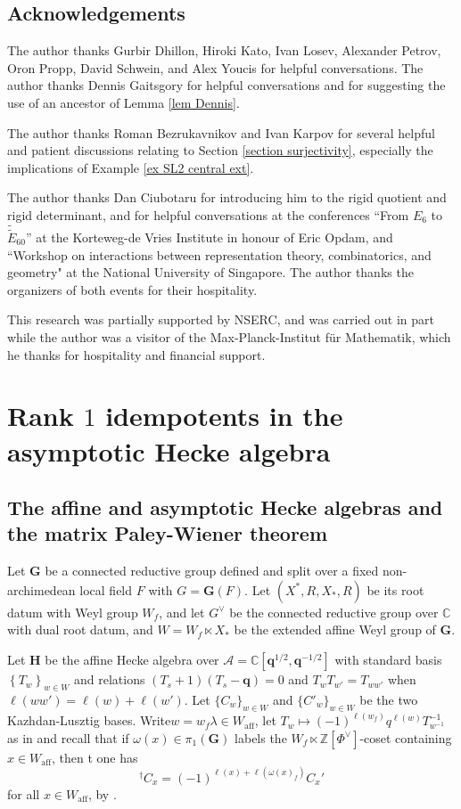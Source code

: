 \documentclass[10pt]{article}
\newcommand{\sett}[1]{\left\{#1\right\}}
\newcommand{\HH}{\mathbf{H}}
\newcommand{\Z}{\mathbb{Z}}
\newcommand{\C}{\mathbb{C}}
\newcommand{\G}{\mathbf{G}}
\newcommand{\Waff}{W_{\mathrm{aff}}}
\newcommand{\bq}{\mathbf{q}}
\theoremstyle{definition}
\theoremstyle{remark}
\newcommand{\Gd}{G^\vee}
\begin{document}
\subsection{Acknowledgements}
The author thanks Gurbir Dhillon, Hiroki Kato, Ivan Losev, Alexander Petrov, Oron Propp,  David Schwein, and Alex Youcis for helpful conversations. The author thanks Dennis Gaitsgory for helpful conversations and for suggesting the use of an ancestor of Lemma \ref{lem Dennis}. 

The author thanks Roman Bezrukavnikov 
and Ivan Karpov for several helpful and patient discussions relating to Section \ref{section surjectivity},
especially the implications of Example \ref{ex SL2 central ext}. 

The author thanks Dan Ciubotaru for introducing him to the rigid quotient and rigid determinant, and 
for helpful conversations at the conferences
``From $E_6$ to 
$\tilde{\tilde{E}}_{60}$'' at the  Korteweg-de Vries Institute in honour of Eric Opdam, and ``Workshop on interactions between representation theory, combinatorics, and geometry" at 
the National University of Singapore. The author thanks the organizers of both events for their 
hospitality.

This research was partially supported by NSERC, and was carried out in part while the author was
a visitor of the Max-Planck-Institut f\"{u}r Mathematik, which he 
thanks for hospitality and financial support.
%
\section{Rank $1$ idempotents in the asymptotic Hecke algebra}
\label{section Rank 1 idempotents}
%
\subsection{The affine and asymptotic Hecke algebras and the matrix Paley-Wiener theorem}
\label{subsubsection and affine and asymptotic Hecke algebras}
Let $\G$ be a connected reductive group defined and split over a fixed non-archimedean local field $F$
with $G=\G(F)$. Let $(X^*, R, X_*, R)$ be its root datum with Weyl group $W_f$, and let $\Gd$ be the connected reductive group over
$\C$ with dual root datum, and $W=W_f\ltimes X_*$ be the extended affine Weyl group of $\G$.

Let $\HH$ be the affine Hecke algebra over $\mathcal{A}=\C[\bq^{1/2},\bq^{-1/2}]$ with standard
basis $\sett{T_w}_{w\in W}$ and relations $(T_s+1)(T_s-\bq)=0$ and $T_wT_{w'}=T_{ww'}$
when $\ell(ww')=\ell(w)+\ell(w')$. Let $\{C_w\}_{w\in W}$ and $\{C'_w\}_{w\in W}$ be the two Kazhdan-Lusztig bases. Write$w=w_f\lambda\in\Waff$, let $T_w\mapsto (-1)^{\ell(w_f)}q^{\ell(w)}T_{w^{-1}}^{-1}$ as in \cite[Def. 6(a)]{Plancherel} and recall that if $\omega(x)\in\pi_1(\G)$ labels the $W_f\ltimes \Z[\Phi^\vee]$-coset containing $x\in\Waff$, then
t one has 
%
\begin{equation}
\label{eqn Goldman on Cw}
{}^\dagger C_x=(-1)^{\ell(x)+\ell(\omega(x)_f)}C_x'
\end{equation}
% 
for all $x\in \Waff$, by \cite[Lemma 2 (a)]{Plancherel}.
\end{document}

